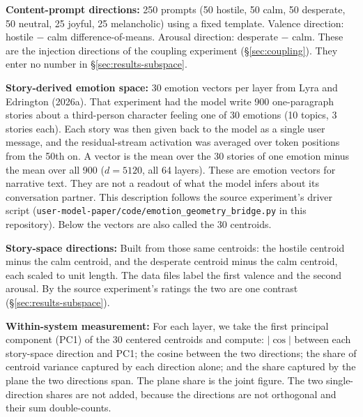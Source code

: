 \documentclass[11pt,a4paper]{article}
\begin{document}
\textbf{Content-prompt directions:} 250 prompts (50 hostile, 50 calm, 50 desperate, 50 neutral, 25 joyful, 25 melancholic) using a fixed template. Valence direction: hostile $-$ calm difference-of-means. Arousal direction: desperate $-$ calm. These are the injection directions of the coupling experiment (\S\ref{sec:coupling}). They enter no number in \S\ref{sec:results-subspace}.

\textbf{Story-derived emotion space:} 30 emotion vectors per layer from Lyra and Edrington (2026a). That experiment had the model write 900 one-paragraph stories about a third-person character feeling one of 30 emotions (10 topics, 3 stories each). Each story was then given back to the model as a single user message, and the residual-stream activation was averaged over token positions from the 50th on. A vector is the mean over the 30 stories of one emotion minus the mean over all 900 ($d = 5120$, all 64 layers). These are emotion vectors for narrative text. They are not a readout of what the model infers about its conversation partner. This description follows the source experiment's driver script (\texttt{user-model-paper/\allowbreak code/\allowbreak emotion\_\allowbreak geometry\_\allowbreak bridge.py} in this repository). Below the vectors are also called the 30 centroids.

\textbf{Story-space directions:} Built from those same centroids: the hostile centroid minus the calm centroid, and the desperate centroid minus the calm centroid, each scaled to unit length. The data files label the first valence and the second arousal. By the source experiment's ratings the two are one contrast (\S\ref{sec:results-subspace}).

\textbf{Within-system measurement:} For each layer, we take the first principal component (PC1) of the 30 centered centroids and compute: $|\cos|$ between each story-space direction and PC1; the cosine between the two directions; the share of centroid variance captured by each direction alone; and the share captured by the plane the two directions span. The plane share is the joint figure. The two single-direction shares are not added, because the directions are not orthogonal and their sum double-counts.
\end{document}
